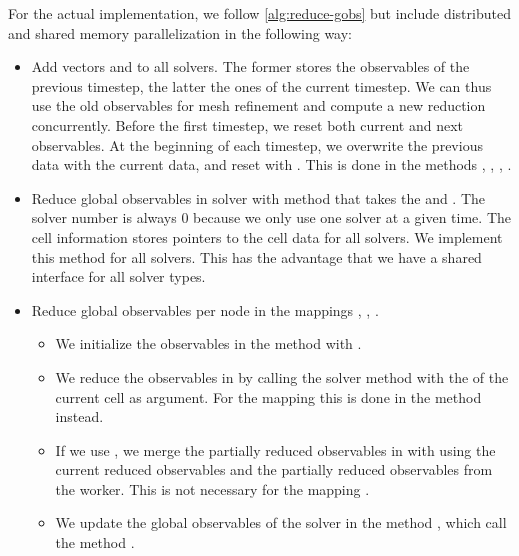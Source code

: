 For the actual implementation, we follow \cref{alg:reduce-gobs} but include distributed and shared memory parallelization in the following way:
\begin{itemize}
\item Add vectors  and  to all solvers.
  The former stores the observables of the previous timestep, the latter the ones of the current timestep.
  We can thus use the old observables for mesh refinement and compute a new reduction concurrently.
  Before the first timestep, we reset both current and next observables.
  At the beginning of each timestep, we overwrite the previous data with the current data, and reset  with .
  This is done in the methods , , , .
\item Reduce global observables in solver with method  that takes the  and .
  The solver number is always 0 because we only use one solver at a given time.
  The cell information stores pointers to the cell data for all solvers.
  We implement this method for all solvers.
  This has the advantage that we have a shared interface for all solver types.
\item Reduce global observables per node in the mappings , , .
  \begin{itemize}
  \item We initialize the observables in the method  with . 
  \item We reduce the observables in  by calling the solver method  with the  of the current cell as argument.
    For the mapping  this is done in the method  instead.
  \item If we use \tbb{}, we merge the partially reduced observables in  with  using the current reduced observables and the partially reduced observables from the worker.
    This is not necessary for the mapping .
   \item We update the global observables of the solver in the method , which call the method .

\end{itemize}
\end{itemize}
